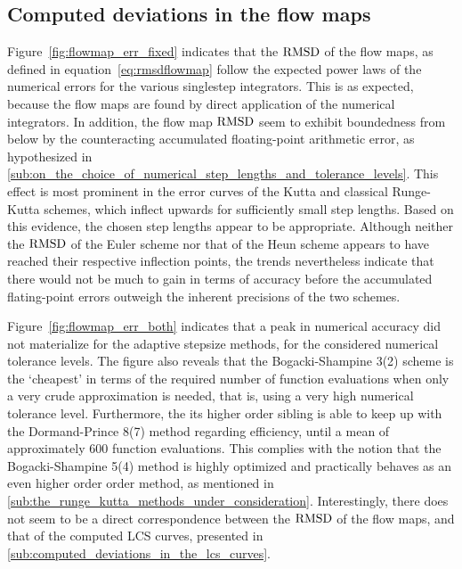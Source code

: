 \subsection{Computed deviations in the flow maps}
\label{sub:computed_deviations_in_the_flow_maps}


Figure~\ref{fig:flowmap_err_fixed} indicates that the $\operatorname{RMSD}$ of the flow maps,
as defined in equation~\eqref{eq:rmsdflowmap} follow the expected power laws
of the numerical errors for the various singlestep integrators. This is
as expected, because the flow maps are found by direct application of the
numerical integrators. In addition, the flow map $\operatorname{RMSD}$ seem to exhibit
boundedness from below by the counteracting accumulated floating-point
arithmetic error, as hypothesized in
\cref{sub:on_the_choice_of_numerical_step_lengths_and_tolerance_levels}.
This effect is most prominent in the error curves of the Kutta and
classical Runge-Kutta schemes, which inflect upwards for sufficiently small
step lengths. Based on this evidence, the chosen step lengths appear to be
appropriate. Although neither the $\operatorname{RMSD}$ of the Euler scheme nor that of the
Heun scheme appears to have reached their respective inflection points, the
trends nevertheless indicate that there would not be much to gain in terms
of accuracy before the accumulated flating-point errors outweigh the inherent
precisions of the two schemes.

Figure~\ref{fig:flowmap_err_both} indicates that a peak in numerical accuracy
did not materialize for the adaptive stepsize methods, for the considered
numerical tolerance levels. The figure also reveals that the Bogacki-Shampine
3(2) scheme is the `cheapest' in terms of the required number of function
evaluations  when only a very crude approximation is needed, that is, using a
very high numerical tolerance level. Furthermore, the its higher order sibling
is able to keep up with the Dormand-Prince 8(7) method regarding efficiency,
until a mean of approximately $600$ function evaluations. This complies with the
notion that the Bogacki-Shampine 5(4) method is highly optimized and practically
behaves as an even higher order order method, as mentioned in
\cref{sub:the_runge_kutta_methods_under_consideration}.
Interestingly, there does not seem to be a direct correspondence between the
$\operatorname{RMSD}$ of the flow maps, and that of the computed LCS curves, presented in
\cref{sub:computed_deviations_in_the_lcs_curves}.





